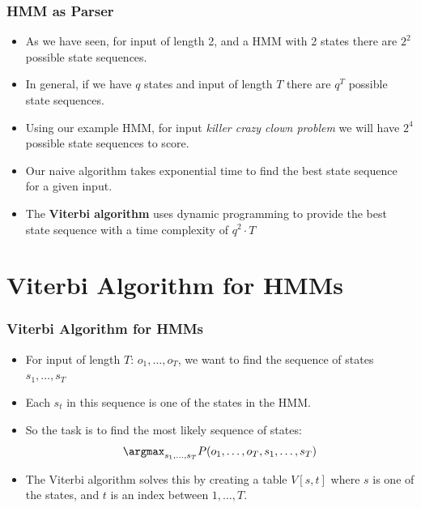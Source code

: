 \begin{frame}
\frametitle{HMM as Parser}
\begin{itemize}[<+->]
\item As we have seen, for input of length 2, and a HMM with 2 states there are $2^2$ possible state sequences.
\item In general, if we have $q$ states and input of length $T$ there are $q^T$ possible state sequences.
\item Using our example HMM, for input {\it killer crazy clown problem} we will have $2^4$ possible state sequences to score.
\item Our naive algorithm takes exponential time to find the best state sequence for a given input.
\item The {\bf Viterbi algorithm} uses dynamic programming to provide the best state sequence with a time complexity of $q^2 \cdot T$
\end{itemize}
\end{frame}

\section{Viterbi Algorithm for HMMs}

\begin{frame}
\frametitle{Viterbi Algorithm for HMMs}
\begin{itemize}[<+->]
\item For input of length $T$: $o_1, \ldots, o_T$, we want to find the sequence of states $s_1, \ldots, s_T$
\item Each $s_t$ in this sequence is one of the states in the HMM.
\item So the task is to find the most likely sequence of states:
\[ \argmax_{s_1, \ldots, s_T} P(o_1, \ldots, o_T, s_1, \ldots, s_T) \]
\item The Viterbi algorithm solves this by creating a table $V[s,t]$ where $s$ is one of the states, and $t$ is an index between $1, \ldots, T$.
\end{itemize}
\end{frame}

